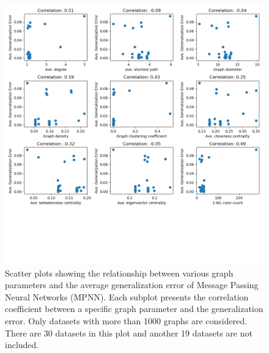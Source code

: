 \begin{figure}[H]
    \centering
    \includegraphics[width=\textwidth]{images/correlation_ignore_less_than_1000_MPNN.png}
    \caption{Scatter plots showing the relationship between various graph parameters and the average generalization error of Message Passing Neural Networks (MPNN). Each subplot presents the correlation coefficient between a specific graph parameter and the generalization error. Only datasets with more than 1000 graphs are considered. There are 30 datasets in this plot and another 19 datasets are not included.}
    \label{fig:correlation_ignore_less_than_1000_MPNN}
\end{figure}
